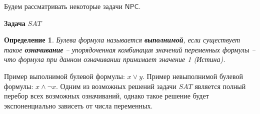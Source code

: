 \documentclass[a4paper,12pt]{article}
\newtheorem{definition}{Определение}
\newcommand{\NPCclass}{\mathsf{NPC}}
\begin{document}
Будем рассматривать некоторые задачи $\NPCclass$.
\begin{algorithm}[H]
    \caption{\textbf{Задача} $SAT$}
    \begin{algorithmic}
    \end{algorithmic}
\end{algorithm}
\begin{definition}
    Булева формула называется \textbf{выполнимой}, если существует такое \textbf{означивание} -- упорядоченная комбинация значений переменных формулы -- что формула при данном означивании принимает значение 1 (Истина).
\end{definition}
Пример выполнимой булевой формулы: $x \vee y$. Пример невыполнимой булевой формулы: $x \wedge \neg x$. Одним из возможных решений задачи $SAT$ является полный перебор всех возможных означиваний, однако такое решение будет экспоненциально зависеть от числа переменных.
\end{document}
